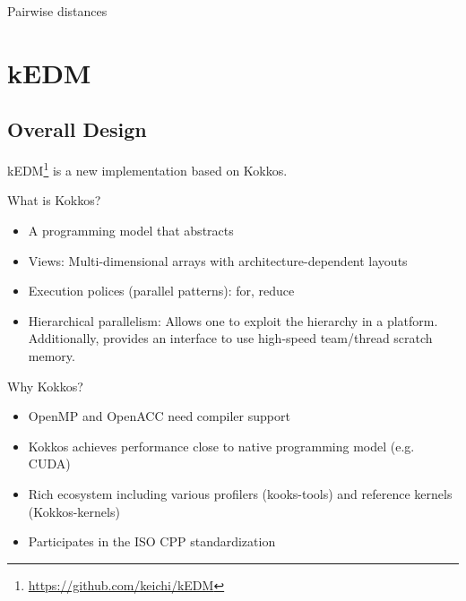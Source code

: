 \documentclass[conference]{IEEEtran}
\begin{document}
\begin{algorithm}
    \SetAlgoLined
    \DontPrintSemicolon
    \caption{Pairwise distances}
    \label{pseudo:knn_cpu}
\end{algorithm}

\section{kEDM}

\subsection{Overall Design}

kEDM\footnote{\url{https://github.com/keichi/kEDM}} is a new implementation
based on Kokkos.

What is Kokkos?
\begin{itemize}
\item A programming model that abstracts
\item Views: Multi-dimensional arrays with architecture-dependent layouts
\item Execution polices (parallel patterns): for, reduce
\item Hierarchical parallelism: Allows one to exploit the hierarchy in a
    platform. Additionally, provides an interface to use high-speed
    team/thread scratch memory.
\end{itemize}

Why Kokkos?
\begin{itemize}
    \item OpenMP and OpenACC need compiler support
    \item Kokkos achieves performance close to native programming model (e.g. CUDA)
    \item Rich ecosystem including various profilers (kooks-tools) and reference kernels  (Kokkos-kernels)
    \item Participates in the ISO CPP standardization
\end{itemize}
\end{document}
